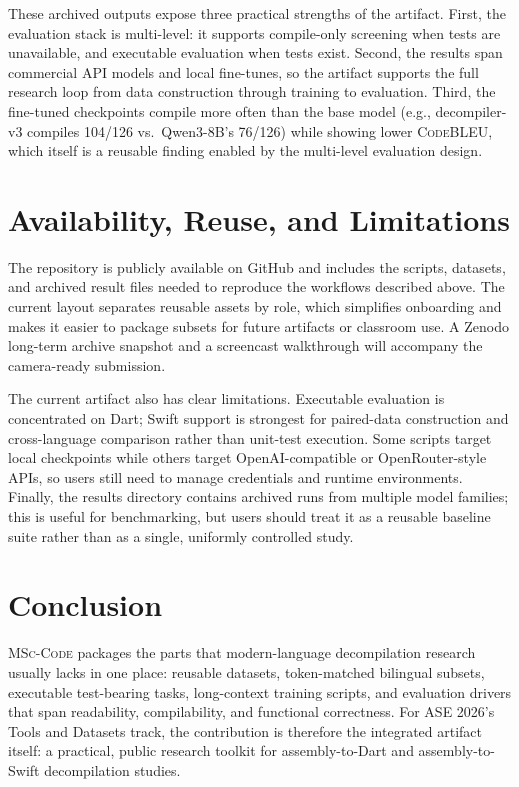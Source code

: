 \documentclass[sigconf,review]{acmart}
\begin{document}
These archived outputs expose three practical strengths of the artifact. First, the evaluation stack is multi-level: it supports compile-only screening when tests are unavailable, and executable evaluation when tests exist. Second, the results span commercial API models and local fine-tunes, so the artifact supports the full research loop from data construction through training to evaluation. Third, the fine-tuned checkpoints compile more often than the base model (e.g., decompiler-v3 compiles 104/126 vs.\ Qwen3-8B's 76/126) while showing lower \textsc{CodeBLEU}, which itself is a reusable finding enabled by the multi-level evaluation design.

\section{Availability, Reuse, and Limitations}
The repository is publicly available on GitHub and includes the scripts, datasets, and archived result files needed to reproduce the workflows described above. The current layout separates reusable assets by role, which simplifies onboarding and makes it easier to package subsets for future artifacts or classroom use. A Zenodo long-term archive snapshot and a screencast walkthrough will accompany the camera-ready submission.

The current artifact also has clear limitations. Executable evaluation is concentrated on Dart; Swift support is strongest for paired-data construction and cross-language comparison rather than unit-test execution. Some scripts target local checkpoints while others target OpenAI-compatible or OpenRouter-style APIs, so users still need to manage credentials and runtime environments. Finally, the results directory contains archived runs from multiple model families; this is useful for benchmarking, but users should treat it as a reusable baseline suite rather than as a single, uniformly controlled study.

\section{Conclusion}
\textsc{MSc-Code} packages the parts that modern-language decompilation research usually lacks in one place: reusable datasets, token-matched bilingual subsets, executable test-bearing tasks, long-context training scripts, and evaluation drivers that span readability, compilability, and functional correctness. For ASE 2026's Tools and Datasets track, the contribution is therefore the integrated artifact itself: a practical, public research toolkit for assembly-to-Dart and assembly-to-Swift decompilation studies.
\end{document}
